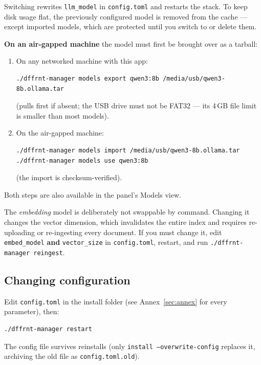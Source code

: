 \documentclass[11pt,letterpaper]{article}
\begin{document}
Switching rewrites \texttt{llm\_model} in \texttt{config.toml} and restarts
the stack. To keep disk usage flat, the previously configured model is
removed from the cache --- except imported models, which are protected until
you switch to or delete them.

\textbf{On an air-gapped machine} the model must first be brought over as a
tarball:

\begin{enumerate}
  \item On any networked machine with this app:
\begin{lstlisting}
./dffrnt-manager models export qwen3:8b /media/usb/qwen3-8b.ollama.tar
\end{lstlisting}
        (pulls first if absent; the USB drive must not be FAT32 --- its
        4\,GB file limit is smaller than most models).
  \item On the air-gapped machine:
\begin{lstlisting}
./dffrnt-manager models import /media/usb/qwen3-8b.ollama.tar
./dffrnt-manager models use qwen3:8b
\end{lstlisting}
        (the import is checksum-verified).
\end{enumerate}

Both steps are also available in the panel's Models view.

\begin{gwarn}
The \emph{embedding} model is deliberately not swappable by command.
Changing it changes the vector dimension, which invalidates the entire index
and requires re-uploading or re-ingesting every document. If you must change
it, edit \texttt{embed\_model} \textbf{and} \texttt{vector\_size} in
\texttt{config.toml}, restart, and run \texttt{./dffrnt-manager reingest}.
\end{gwarn}

\subsection{Changing configuration}

Edit \texttt{config.toml} in the install folder (see
Annex~\ref{sec:annex} for every parameter), then:

\begin{lstlisting}
./dffrnt-manager restart
\end{lstlisting}

The config file survives reinstalls (only \texttt{install
--overwrite-config} replaces it, archiving the old file as
\texttt{config.toml.old}).
\end{document}
